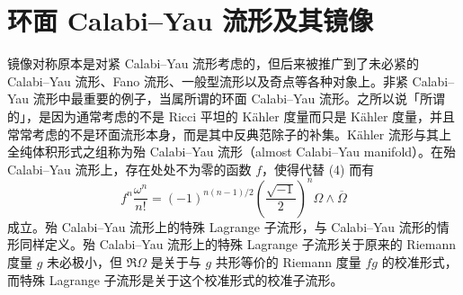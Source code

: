 \section{环面 Calabi--Yau 流形及其镜像}

镜像对称原本是对紧 Calabi--Yau 流形考虑的，但后来被推广到了未必紧的 Calabi--Yau 流形、Fano 流形、一般型流形以及奇点等各种对象上。非紧 Calabi--Yau 流形中最重要的例子，当属所谓的环面 Calabi--Yau 流形。之所以说「所谓的」，是因为通常考虑的不是 Ricci 平坦的 K\"ahler 度量而只是 K\"ahler 度量，并且常常考虑的不是环面流形本身，而是其中反典范除子的补集。K\"ahler 流形与其上全纯体积形式之组称为殆 Calabi--Yau 流形（almost Calabi--Yau manifold）。在殆 Calabi--Yau 流形上，存在处处不为零的函数 $f$，使得代替 (4) 而有
\begin{equation}
f^n\frac{\omega^n}{n!}=(-1)^{n(n-1)/2}\left(\frac{\sqrt{-1}}{2}\right)^n\Omega\wedge\overline{\Omega}
\tag{6}
\end{equation}
\noindent 成立。殆 Calabi--Yau 流形上的特殊 Lagrange 子流形，与 Calabi--Yau 流形的情形同样定义。殆 Calabi--Yau 流形上的特殊 Lagrange 子流形关于原来的 Riemann 度量 $g$ 未必极小，但 $\Re\Omega$ 是关于与 $g$ 共形等价的 Riemann 度量 $fg$ 的校准形式，而特殊 Lagrange 子流形是关于这个校准形式的校准子流形。


